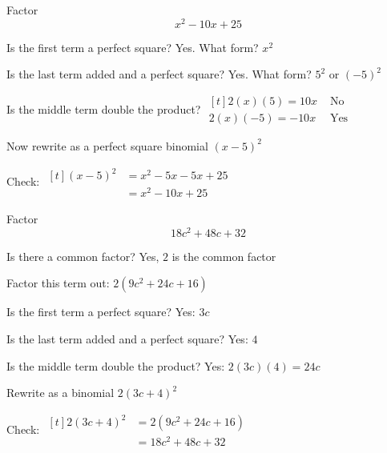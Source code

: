 \begin{myexample}
Factor
\[
	x^2-10x+25
\]
\end{myexample}
\begin{myProof}
	\begin{steps}
		\item Is the first term a perfect square?          \hfill Yes.    What form?  $x^2$
		\item Is the last term added and a perfect square? \hfill Yes.    What form?  $5^2$  or  $(-5)^2$
		\item Is the middle term double the product?        \hfill 
		$\begin{aligned}[t]
			2(x)(5)=10x     & \text{ No}  \\
			2(x)(-5) = -10x & \text{ Yes} 
		\end{aligned}$
		\item Now rewrite as a perfect square binomial     \hfill $(x-5)^2$
		\item Check:
		$\begin{aligned}[t]
			(x-5)^2 & =		x^2-5x-5x+25 \\
			        & =		x^2-10x+25   
		\end{aligned}$
	\end{steps}
	{}
\end{myProof} 

\begin{myexample}
Factor
\[
	18c^2+48c + 32
\]
\end{myexample}
\begin{myProof}
	\begin{steps}
		\item Is there a common factor?                    \hfill Yes, $2$ is the common factor 
		\item Factor this term out:                        \hfill $2(9c^2+24c+16)$
		\item Is the first term a perfect square?          \hfill Yes:  $3c$
		\item Is the last term added and a perfect square? \hfill Yes:  $4$                      
		\item Is the middle term double the product?       \hfill Yes:  $2(3c)(4)=24c$
		\item Rewrite as a binomial                        \hfill $2(3c+4)^2$                     
		\item Check: 
		$\begin{aligned}[t]
			2(3c+4)^2 & = 2(9c^2+24c+16) \\
			          & = 18c^2+48c+32   
		\end{aligned}$ 
	\end{steps}
	{}
\end{myProof} 

